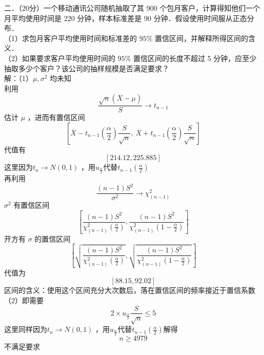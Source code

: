 \documentclass[UTF8,openany]{book}
\begin{document}
	\noindent 二．（20分）一个移动通讯公司随机抽取了其 900 个包月客户，计算得知他们一个月平均使用时间是 220 分钟，样本标准差是 90 分钟．假设使用时间服从正态分布．\\
	（1）求包月客户平均使用时间和标准差的 $95 \%$ 置信区间，并解释所得区间的含义．\\
	（2）如果要求客户平均使用时间的 $95 \%$ 置信区间的长度不超过 5 分钟，应至少抽取多少个客户？该公司的抽样规模是否满足要求？\\
	解：（1）$\mu, \sigma^2$ 均未知\\
	利用 
	$$\frac{\sqrt{n}(\overline{X}-\mu)}{S} \rightarrow t_{n-1}$$
	估计 $\mu$ ，进而有置信区间
	\[
	\left[ \overline{X} - t_{n-1}\left(\frac{\alpha}{2}\right) \frac{S}{\sqrt{n}},\ 
	\overline{X} + t_{n-1}\left(\frac{\alpha}{2}\right) \frac{S}{\sqrt{n}} \right]
	\]
	代值有
	$$[214.12,225.885]$$ 
	这里因为$t_n\rightarrow N(0,1)$ ，用$u_{\frac{\alpha}{2}}$代替$t_{n-1}\left(\frac{\alpha}{2}\right)$\\
	再利用 
	$$\frac{(n-1) S^2}{\sigma^2} \rightarrow \chi^2_{(n-1)}$$
	$\sigma^2$ 有置信区间 
	$$\left[\frac{(n-1) S^2}{\chi^2_{(n-1)}\left(\frac{\alpha}{2}\right)}, \frac{(n-1) S^2}{\chi^2_{(n-1)}\left(1-\frac{\alpha}{2}\right)}\right]$$
	开方有 $\sigma$ 的置信区间
	$$
	\left[\sqrt{\frac{(n-1) S^2}{\chi^2_{(n-1)}\left(\frac{\alpha}{2}\right)}},\sqrt{\frac{(n-1) S^2}{\chi^2_{(n-1)}\left(1-\frac{\alpha}{2}\right)}}\right]
	$$
	代值为
	\[
	[88.15,92.02]
	\]
	区间的含义：使用这个区间充分大次数后，落在置信区间的频率接近于置信系数\\
	（2）即需要
	\[
	2\times u_{\frac{\alpha}{2}}\frac{S}{\sqrt{n}}\le 5
	\]
	这里同样因为$t_n\rightarrow N(0,1)$ ，用$u_{\frac{\alpha}{2}}$代替$t_{n-1}\left(\frac{\alpha}{2}\right)$解得
	\[
	n\ge 4979
	\]
	不满足要求\\
	
	
	
\end{document}
